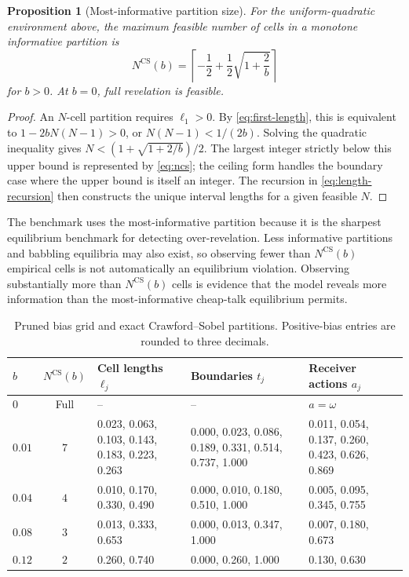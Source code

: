 \documentclass[11pt]{article}
\newtheorem{proposition}{Proposition}
\newcommand{\NCS}{N^{\mathrm{CS}}}
\begin{document}
\begin{proposition}[Most-informative partition size]\label{prop:ncs}
For the uniform-quadratic environment above, the maximum feasible number of cells in a monotone informative partition is
\begin{equation}\label{eq:ncs}
    \NCS(b)=\left\lceil -\frac{1}{2}+\frac{1}{2}\sqrt{1+\frac{2}{b}}\right\rceil
\end{equation}
for $b>0$.  At $b=0$, full revelation is feasible.
\end{proposition}

\begin{proof}
An $N$-cell partition requires $\ell_1>0$.  By \eqref{eq:first-length}, this is equivalent to $1-2bN(N-1)>0$, or $N(N-1)<1/(2b)$.  Solving the quadratic inequality gives $N<(1+\sqrt{1+2/b})/2$.  The largest integer strictly below this upper bound is represented by \eqref{eq:ncs}; the ceiling form handles the boundary case where the upper bound is itself an integer.  The recursion in \eqref{eq:length-recursion} then constructs the unique interval lengths for a given feasible $N$.
\end{proof}

The benchmark uses the most-informative partition because it is the sharpest equilibrium benchmark for detecting over-revelation.  Less informative partitions and babbling equilibria may also exist, so observing fewer than $\NCS(b)$ empirical cells is not automatically an equilibrium violation.  Observing substantially more than $\NCS(b)$ cells is evidence that the model reveals more information than the most-informative cheap-talk equilibrium permits.

\begin{table}[H]
\centering
\scriptsize
\caption{Pruned bias grid and exact Crawford--Sobel partitions.  Positive-bias entries are rounded to three decimals.}
\label{tab:bias-grid}
\begin{tabularx}{\linewidth}{lclYY}
\toprule
$b$ & $\NCS(b)$ & Cell lengths $\ell_j$ & Boundaries $t_j$ & Receiver actions $a_j$ \\
\midrule
$0$ & Full & -- & -- & $a=\omega$ \\
$0.01$ & $7$ & 0.023, 0.063, 0.103, 0.143, 0.183, 0.223, 0.263 & 0.000, 0.023, 0.086, 0.189, 0.331, 0.514, 0.737, 1.000 & 0.011, 0.054, 0.137, 0.260, 0.423, 0.626, 0.869 \\
$0.04$ & $4$ & 0.010, 0.170, 0.330, 0.490 & 0.000, 0.010, 0.180, 0.510, 1.000 & 0.005, 0.095, 0.345, 0.755 \\
$0.08$ & $3$ & 0.013, 0.333, 0.653 & 0.000, 0.013, 0.347, 1.000 & 0.007, 0.180, 0.673 \\
$0.12$ & $2$ & 0.260, 0.740 & 0.000, 0.260, 1.000 & 0.130, 0.630 \\
\bottomrule
\end{tabularx}
\end{table}
\end{document}
